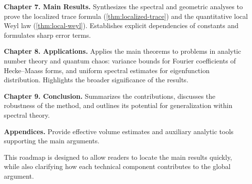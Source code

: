 \medskip

\noindent \textbf{Chapter 7. Main Results.}
Synthesizes the spectral and geometric analyses to prove the localized
trace formula (\cref{thm:localized-trace}) and the quantitative local
Weyl law (\cref{thm:local-weyl}). Establishes explicit dependencies
of constants and formulates sharp error terms.

\medskip

\noindent \textbf{Chapter 8. Applications.}
Applies the main theorems to problems in analytic number theory and
quantum chaos: variance bounds for Fourier coefficients of
Hecke–Maass forms, and uniform spectral estimates for eigenfunction
distribution. Highlights the broader significance of the results.

\medskip

\noindent \textbf{Chapter 9. Conclusion.}
Summarizes the contributions, discusses the robustness of the method,
and outlines its potential for generalization within spectral theory.

\medskip

\noindent \textbf{Appendices.}
Provide effective volume estimates and auxiliary analytic tools
supporting the main arguments.

\medskip

\noindent This roadmap is designed to allow readers to locate the
main results quickly, while also clarifying how each technical
component contributes to the global argument.

